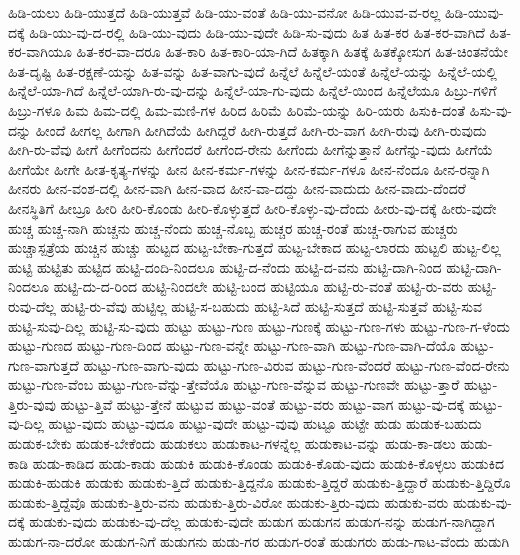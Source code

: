 {ಹಿಡಿ-ಯಲು
ಹಿಡಿ-ಯುತ್ತದೆ
ಹಿಡಿ-ಯುತ್ತವೆ
ಹಿಡಿ-ಯು-ವಂತೆ
ಹಿಡಿ-ಯು-ವನೋ
ಹಿಡಿ-ಯುವ-ವ-ರಲ್ಲ
ಹಿಡಿ-ಯುವು-ದಕ್ಕೆ
ಹಿಡಿ-ಯು-ವು-ದ-ರಲ್ಲಿ
ಹಿಡಿ-ಯು-ವುದು
ಹಿಡಿ-ಯು-ವುದೇ
ಹಿಡಿ-ಸು-ವುದು
ಹಿತ
ಹಿತ-ಕರ
ಹಿತ-ಕರ-ವಾಗಿದೆ
ಹಿತ-ಕರ-ವಾಗಿಯೂ
ಹಿತ-ಕರ-ವಾ-ದರೂ
ಹಿತ-ಕಾರಿ
ಹಿತ-ಕಾರಿ-ಯಾ-ಗಿದೆ
ಹಿತಕ್ಕಾಗಿ
ಹಿತಕ್ಕೆ
ಹಿತಕ್ಕೋಸುಗ
ಹಿತ-ಚಿಂತನೆಯೇ
ಹಿತ-ದೃಷ್ಟಿ
ಹಿತ-ರಕ್ಷಣೆ-ಯನ್ನು
ಹಿತ-ವನ್ನು
ಹಿತ-ವಾಗು-ವುದೆ
ಹಿನ್ನೆಲೆ
ಹಿನ್ನೆಲೆ-ಯಂತೆ
ಹಿನ್ನೆಲೆ-ಯನ್ನು
ಹಿನ್ನೆಲೆ-ಯಲ್ಲಿ
ಹಿನ್ನೆಲೆ-ಯಾ-ಗಿದೆ
ಹಿನ್ನೆಲೆ-ಯಾಗಿ-ರು-ವು-ದನ್ನು
ಹಿನ್ನೆಲೆ-ಯಾ-ಗು-ವುದು
ಹಿನ್ನೆಲೆ-ಯಿಂದ
ಹಿನ್ನೆಲೆಯೂ
ಹಿಬ್ರು-ಗಳಿಗೆ
ಹಿಬ್ರು-ಗಳೂ
ಹಿಮ
ಹಿಮ-ದಲ್ಲಿ
ಹಿಮ-ಮಣಿ-ಗಳ
ಹಿರಿದ
ಹಿರಿಮೆ
ಹಿರಿಮೆ-ಯನ್ನು
ಹಿರಿ-ಯರು
ಹಿಸುಕಿ-ದಂತೆ
ಹಿಸು-ವು-ದನ್ನು
ಹೀಂದೆ
ಹೀಗಲ್ಲ
ಹೀಗಾಗಿ
ಹೀಗಿದೆಯೆ
ಹೀಗಿದ್ದರೆ
ಹೀಗಿ-ರುತ್ತದೆ
ಹೀಗಿ-ರು-ವಾಗ
ಹೀಗಿ-ರುವು
ಹೀಗಿ-ರುವುದು
ಹೀಗಿ-ರು-ವೆವು
ಹೀಗೆ
ಹೀಗೆಂದನು
ಹೀಗೆಂದರೆ
ಹೀಗೆಂದ-ರೇನು
ಹೀಗೆಂದು
ಹೀಗೆನ್ನುತ್ತಾನೆ
ಹೀಗೆನ್ನು-ವುದು
ಹೀಗೆಯೆ
ಹೀಗೆಯೇ
ಹೀಗೇ
ಹೀತ-ಕೃತ್ಯ-ಗಳನ್ನು
ಹೀನ
ಹೀನ-ಕರ್ಮ-ಗಳನ್ನು
ಹೀನ-ಕರ್ಮ-ಗಳೂ
ಹೀನ-ನೆಂದೂ
ಹೀನ-ರನ್ನಾಗಿ
ಹೀನರು
ಹೀನ-ವಂಶ-ದಲ್ಲಿ
ಹೀನ-ವಾಗಿ
ಹೀನ-ವಾದ
ಹೀನ-ವಾ-ದದ್ದು
ಹೀನ-ವಾದುದು
ಹೀನ-ವಾದು-ದೆಂದರೆ
ಹೀನಸ್ಥಿತಿಗೆ
ಹೀಬ್ರೂ
ಹೀರಿ
ಹೀರಿ-ಕೊಂಡು
ಹೀರಿ-ಕೊಳ್ಳುತ್ತದೆ
ಹೀರಿ-ಕೊಳ್ಳು-ವು-ದೆಂದು
ಹೀರು-ವು-ದಕ್ಕೆ
ಹೀರು-ವುದೇ
ಹುಚ್ಚ
ಹುಚ್ಚ-ನಾಗಿ
ಹುಚ್ಚನು
ಹುಚ್ಚ-ನೆಂದು
ಹುಚ್ಚ-ನೊಬ್ಬ
ಹುಚ್ಚರ
ಹುಚ್ಚ-ರಂತೆ
ಹುಚ್ಚ-ರಾಗುವ
ಹುಚ್ಚರು
ಹುಚ್ಚಾಸ್ಪತ್ರೆಯ
ಹುಚ್ಚಿನ
ಹುಚ್ಚು
ಹುಟ್ಟದ
ಹುಟ್ಟ-ಬೇಕಾ-ಗುತ್ತದೆ
ಹುಟ್ಟ-ಬೇಕಾದ
ಹುಟ್ಟ-ಲಾರದು
ಹುಟ್ಟಲಿ
ಹುಟ್ಟ-ಲಿಲ್ಲ
ಹುಟ್ಟಿ
ಹುಟ್ಟಿತು
ಹುಟ್ಟಿದ
ಹುಟ್ಟಿ-ದಂದಿ-ನಿಂದಲೂ
ಹುಟ್ಟಿ-ದ-ನೆಂದು
ಹುಟ್ಟಿ-ದ-ವನು
ಹುಟ್ಟಿ-ದಾಗಿ-ನಿಂದ
ಹುಟ್ಟಿ-ದಾಗಿ-ನಿಂದಲೂ
ಹುಟ್ಟಿ-ದು-ದ-ರಿಂದ
ಹುಟ್ಟಿ-ನಿಂದಲೇ
ಹುಟ್ಟಿ-ಬಂದ
ಹುಟ್ಟಿಯೂ
ಹುಟ್ಟಿ-ರು-ವಂತೆ
ಹುಟ್ಟಿ-ರು-ವರು
ಹುಟ್ಟಿ-ರುವು-ದೆಲ್ಲ
ಹುಟ್ಟಿ-ರು-ವೆವು
ಹುಟ್ಟಿಲ್ಲ
ಹುಟ್ಟಿ-ಸ-ಬಹುದು
ಹುಟ್ಟಿ-ಸಿದೆ
ಹುಟ್ಟಿ-ಸುತ್ತದೆ
ಹುಟ್ಟಿ-ಸುತ್ತವೆ
ಹುಟ್ಟಿ-ಸುವ
ಹುಟ್ಟಿ-ಸುವು-ದಿಲ್ಲ
ಹುಟ್ಟಿ-ಸು-ವುದು
ಹುಟ್ಟು
ಹುಟ್ಟು-ಗುಣ
ಹುಟ್ಟು-ಗುಣಕ್ಕೆ
ಹುಟ್ಟು-ಗುಣ-ಗಳು
ಹುಟ್ಟು-ಗುಣ-ಗ-ಳೆಂದು
ಹುಟ್ಟು-ಗುಣದ
ಹುಟ್ಟು-ಗುಣ-ದಿಂದ
ಹುಟ್ಟು-ಗುಣ-ವನ್ನೇ
ಹುಟ್ಟು-ಗುಣ-ವಾಗಿ
ಹುಟ್ಟು-ಗುಣ-ವಾಗಿ-ದೆಯೊ
ಹುಟ್ಟು-ಗುಣ-ವಾಗುತ್ತದೆ
ಹುಟ್ಟು-ಗುಣ-ವಾಗು-ವುದು
ಹುಟ್ಟು-ಗುಣ-ವಿರುವ
ಹುಟ್ಟು-ಗುಣ-ವೆಂದರೆ
ಹುಟ್ಟು-ಗುಣ-ವೆಂದ-ರೇನು
ಹುಟ್ಟು-ಗುಣ-ವೆಂಬ
ಹುಟ್ಟು-ಗುಣ-ವೆನ್ನು-ತ್ತೇವೆಯೊ
ಹುಟ್ಟು-ಗುಣ-ವೆನ್ನುವ
ಹುಟ್ಟು-ಗುಣವೇ
ಹುಟ್ಟು-ತ್ತಾರೆ
ಹುಟ್ಟು-ತ್ತಿರು-ವುವು
ಹುಟ್ಟು-ತ್ತಿವೆ
ಹುಟ್ಟು-ತ್ತೇನೆ
ಹುಟ್ಟುವ
ಹುಟ್ಟು-ವಂತೆ
ಹುಟ್ಟು-ವರು
ಹುಟ್ಟು-ವಾಗ
ಹುಟ್ಟು-ವು-ದಕ್ಕೆ
ಹುಟ್ಟು-ವು-ದಿಲ್ಲ
ಹುಟ್ಟು-ವುದು
ಹುಟ್ಟು-ವುದೂ
ಹುಟ್ಟು-ವುದೇ
ಹುಟ್ಟು-ವುವು
ಹುಟ್ಟೂ
ಹುಟ್ಟೇ
ಹುಡು
ಹುಡುಕ-ಬಹುದು
ಹುಡುಕ-ಬೇಕು
ಹುಡುಕ-ಬೇಕೆಂದು
ಹುಡುಕಲು
ಹುಡುಕಾಟ-ಗಳನ್ನೆಲ್ಲ
ಹುಡುಕಾಟ-ವನ್ನು
ಹುಡು-ಕಾ-ಡಲು
ಹುಡು-ಕಾಡಿ
ಹುಡು-ಕಾಡಿದ
ಹುಡು-ಕಾಡು
ಹುಡುಕಿ
ಹುಡುಕಿ-ಕೊಂಡು
ಹುಡುಕಿ-ಕೊಡು-ವುದು
ಹುಡುಕಿ-ಕೊಳ್ಳಲು
ಹುಡುಕಿದ
ಹುಡುಕಿ-ಹುಡುಕಿ
ಹುಡುಕು
ಹುಡುಕು-ತ್ತಿದೆ
ಹುಡುಕು-ತ್ತಿದ್ದನೊ
ಹುಡುಕು-ತ್ತಿದ್ದರೆ
ಹುಡುಕು-ತ್ತಿದ್ದಾರೆ
ಹುಡುಕು-ತ್ತಿದ್ದಿರೊ
ಹುಡುಕು-ತ್ತಿದ್ದೆವೊ
ಹುಡುಕು-ತ್ತಿರು-ವನು
ಹುಡುಕು-ತ್ತಿರು-ವಿರೋ
ಹುಡುಕು-ತ್ತಿರು-ವುದು
ಹುಡುಕು-ವರು
ಹುಡುಕು-ವು-ದಕ್ಕೆ
ಹುಡುಕು-ವುದು
ಹುಡುಕು-ವು-ದೆಲ್ಲ
ಹುಡುಕು-ವುದೇ
ಹುಡುಗ
ಹುಡುಗನ
ಹುಡುಗ-ನನ್ನು
ಹುಡುಗ-ನಾಗಿದ್ದಾಗ
ಹುಡುಗ-ನಾ-ದರೋ
ಹುಡುಗ-ನಿಗೆ
ಹುಡುಗನು
ಹುಡು-ಗರ
ಹುಡುಗ-ರಂತೆ
ಹುಡುಗರು
ಹುಡು-ಗಾಟ-ವೆಂದು
ಹುಡುಗಿ
}
